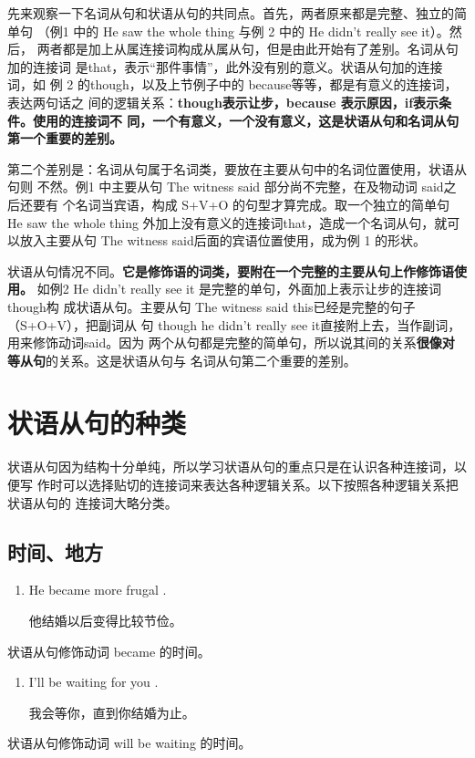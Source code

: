 先来观察一下名词从句和状语从句的共同点。首先，两者原来都是完整、独立的简单句
（例1 中的 He saw the whole thing 与例 2 中的 He didn't really see it）。然后，
两者都是加上从属连接词构成从属从句，但是由此开始有了差别。名词从句加的连接词
是that，表示“那件事情”，此外没有别的意义。状语从句加的连接词，如
例 2 的though，以及上节例子中的 because等等，都是有意义的连接词，表达两句话之
间的逻辑关系：\textbf{though表示让步，because 表示原因，if表示条件。使用的连接词不
同，一个有意义，一个没有意义，这是状语从句和名词从句第一个重要的差别。}

第二个差别是：名词从句属于名词类，要放在主要从句中的名词位置使用，状语从句则
不然。例1 中主要从句 The witness said 部分尚不完整，在及物动词 said之后还要有
个名词当宾语，构成 S+V+O 的句型才算完成。取一个独立的简单句 He saw the whole
thing 外加上没有意义的连接词that，造成一个名词从句，就可以放入主要从句 The
witness said后面的宾语位置使用，成为例 1 的形状。

状语从句情况不同。\textbf{它是修饰语的词类，要附在一个完整的主要从句上作修饰语使用。}
如例2 He didn't really see it 是完整的单句，外面加上表示让步的连接词 though构
成状语从句。主要从句 The witness said this已经是完整的句子（S+O+V），把副词从
句 though he didn't really see it直接附上去，当作副词，用来修饰动词said。因为
两个从句都是完整的简单句，所以说其间的关系\textbf{很像对等从句}的关系。这是状语从句与
名词从句第二个重要的差别。

\section{状语从句的种类}

状语从句因为结构十分单纯，所以学习状语从句的重点只是在认识各种连接词，以便写
作时可以选择贴切的连接词来表达各种逻辑关系。以下按照各种逻辑关系把状语从句的
连接词大略分类。

\subsection{时间、地方}

\begin{enumerate}
\item He became more frugal  .

  他结婚以后变得比较节俭。
\end{enumerate}
状语从句修饰动词 became 的时间。

\begin{enumerate}[resume]
\item I'll be waiting for you  .

  我会等你，直到你结婚为止。
\end{enumerate}
状语从句修饰动词 will be waiting 的时间。

